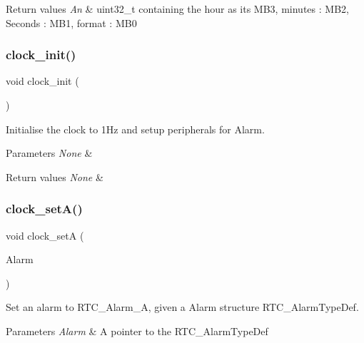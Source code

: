 \begin{DoxyRetVals}{Return values}
{\em An} & uint32\+\_\+t containing the hour as its M\+B3, minutes \+: M\+B2, Seconds \+: M\+B1, format \+: M\+B0 \\
\hline
\end{DoxyRetVals}
\mbox{\label{group___clock_ga78ab77b57cf2e00089f0a3a22508524c}} 
\subsubsection{\texorpdfstring{clock\+\_\+init()}{clock\_init()}}
{\footnotesize\ttfamily void clock\+\_\+init (\begin{DoxyParamCaption}\item[{void}]{ }\end{DoxyParamCaption})}



Initialise the clock to 1\+Hz and setup peripherals for Alarm. 


\begin{DoxyParams}{Parameters}
{\em None} & \\
\hline
\end{DoxyParams}

\begin{DoxyRetVals}{Return values}
{\em None} & \\
\hline
\end{DoxyRetVals}
\mbox{\label{group___clock_gab56f512746d4f2638232db28bb7dac2b}} 
\subsubsection{\texorpdfstring{clock\+\_\+set\+A()}{clock\_setA()}}
{\footnotesize\ttfamily void clock\+\_\+setA (\begin{DoxyParamCaption}\item[{R\+T\+C\+\_\+\+Alarm\+Type\+Def $\ast$}]{Alarm }\end{DoxyParamCaption})}



Set an alarm to R\+T\+C\+\_\+\+Alarm\+\_\+A, given a Alarm structure R\+T\+C\+\_\+\+Alarm\+Type\+Def. 


\begin{DoxyParams}{Parameters}
{\em Alarm} & A pointer to the R\+T\+C\+\_\+\+Alarm\+Type\+Def \\
\hline
\end{DoxyParams}

